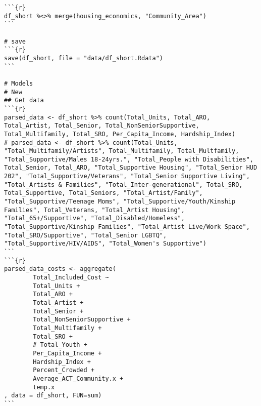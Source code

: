 \documentclass{article}
\begin{document}
\begin{verbatim}
```{r}
df_short %<>% merge(housing_economics, "Community_Area")
```

# save
```{r}
save(df_short, file = "data/df_short.Rdata")
```

# Models
# New
## Get data
```{r}
parsed_data <- df_short %>% count(Total_Units, Total_ARO, Total_Artist, Total_Senior, Total_NonSeniorSupportive, Total_Multifamily, Total_SRO, Per_Capita_Income, Hardship_Index)
# parsed_data <- df_short %>% count(Total_Units, "Total_Multifamily/Artists", Total_Multifamily, Total_Multfamily, "Total_Supportive/Males 18-24yrs.", "Total_People with Disabilities", Total_Senior, Total_ARO, "Total_Supportive Housing", "Total_Senior HUD 202", "Total_Supportive/Veterans", "Total_Senior Supportive Living", "Total_Artists & Families", "Total_Inter-generational", Total_SRO, Total_Supportive, Total_Seniors, "Total_Artist/Family", "Total_Supportive/Teenage Moms", "Total_Supportive/Youth/Kinship Families", Total_Veterans, "Total_Artist Housing", "Total_65+/Supportive", "Total_Disabled/Homeless", "Total_Supportive/Kinship Families", "Total_Artist Live/Work Space", "Total_SRO/Supportive", "Total_Senior LGBTQ", "Total_Supportive/HIV/AIDS", "Total_Women's Supportive")
```
```{r}
parsed_data_costs <- aggregate(
        Total_Included_Cost ~
        Total_Units +
        Total_ARO +
        Total_Artist +
        Total_Senior +
        Total_NonSeniorSupportive +
        Total_Multifamily +
        Total_SRO +
        # Total_Youth +
        Per_Capita_Income +
        Hardship_Index +
        Percent_Crowded +
        Average_ACT_Community.x +
        temp.x
, data = df_short, FUN=sum)
```


\end{verbatim}
\end{document}

